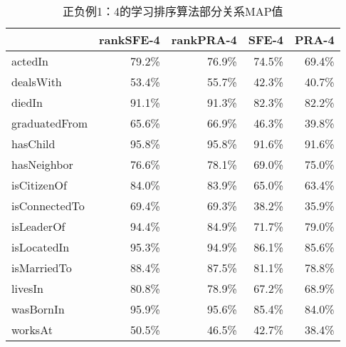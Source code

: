 \begin{table}[htbp]
  \centering
  \caption{正负例1：4的学习排序算法部分关系MAP值}
    \begin{tabular}{|l|r|r|r|r|}
    \hline
          & \multicolumn{1}{l|}{rankSFE-4} & \multicolumn{1}{l|}{rankPRA-4} & \multicolumn{1}{l|}{SFE-4} & \multicolumn{1}{l|}{PRA-4} \bigstrut\\
    \hline
    actedIn                                                     & 79.2\%  & 76.9\%  & 74.5\%  & 69.4\%  \bigstrut\\
    \hline
    dealsWith                                                   & 53.4\%  & 55.7\%  & 42.3\%  & 40.7\%  \bigstrut\\
    \hline
    diedIn                                                      & 91.1\%  & 91.3\%  & 82.3\%  & 82.2\%  \bigstrut\\
    \hline
    graduatedFrom                                               & 65.6\%  & 66.9\%  & 46.3\%  & 39.8\%  \bigstrut\\
    \hline
    hasChild                                                    & 95.8\%  & 95.8\%  & 91.6\%  & 91.6\%  \bigstrut\\
    \hline
    hasNeighbor                                                 & 76.6\%  & 78.1\%  & 69.0\%  & 75.0\%  \bigstrut\\
    \hline
    isCitizenOf                                                 & 84.0\%  & 83.9\%  & 65.0\%  & 63.4\%  \bigstrut\\
    \hline
    isConnectedTo                                               & 69.4\%  & 69.3\%  & 38.2\%  & 35.9\%  \bigstrut\\
    \hline
    isLeaderOf                                                  & 94.4\%  & 84.9\%  & 71.7\%  & 79.0\%  \bigstrut\\
    \hline
    isLocatedIn                                                 & 95.3\%  & 94.9\%  & 86.1\%  & 85.6\%  \bigstrut\\
    \hline
    isMarriedTo                                                 & 88.4\%  & 87.5\%  & 81.1\%  & 78.8\%  \bigstrut\\
    \hline
    livesIn                                                     & 80.8\%  & 78.9\%  & 67.2\%  & 68.9\%  \bigstrut\\
    \hline
    wasBornIn                                                   & 95.9\%  & 95.6\%  & 85.4\%  & 84.0\%  \bigstrut\\
    \hline
    worksAt                                                     & 50.5\%  & 46.5\%  & 42.7\%  & 38.4\%  \bigstrut\\
    \hline
    \end{tabular}%
  \label{tab:kbc-yago-rank4}%
\end{table}%

